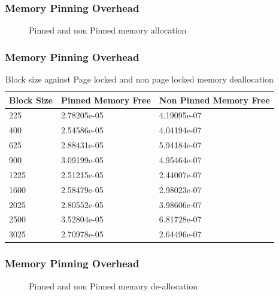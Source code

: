 \documentclass{beamer}
\begin{document}
\begin{frame}[fragile]
  \frametitle{Memory Pinning Overhead}
  \pause
  \begin{figure}[h]
    \resizebox{.9\linewidth}{!}{}
    \caption{Pinned and non Pinned memory allocation}
  \end{figure}
\end{frame}

\begin{frame}[fragile]
  \frametitle{Memory Pinning Overhead}
  \begin{table}[h]
    \centering
    \begin{tabular}{l<{\onslide<2->} | l<{\onslide<3->} | l<{\onslide}}
      \hline
      Block Size & Pinned Memory Free & Non Pinned Memory Free \\
      \hline
      225        & 2.78205e-05        & 4.19095e-07            \\
      400        & 2.54586e-05        & 4.04194e-07            \\
      625        & 2.88431e-05        & 5.94184e-07            \\
      900        & 3.09199e-05        & 4.95464e-07            \\
      1225       & 2.51215e-05        & 2.44007e-07            \\
      1600       & 2.58479e-05        & 2.98023e-07            \\
      2025       & 2.80552e-05        & 3.98606e-07            \\
      2500       & 3.52804e-05        & 6.81728e-07            \\
      3025       & 2.70978e-05        & 2.64496e-07            \\
      \hline
    \end{tabular}
    \caption{Block size against Page locked and non page locked memory deallocation}
    \label{tab:mempin_free}
  \end{table}
\end{frame}

\begin{frame}[fragile]
  \frametitle{Memory Pinning Overhead}
  \pause
  \begin{figure}[h]
    \resizebox{.9\linewidth}{!}{}
    \caption{Pinned and non Pinned memory de-allocation}
  \end{figure}
\end{frame}
\end{document}
